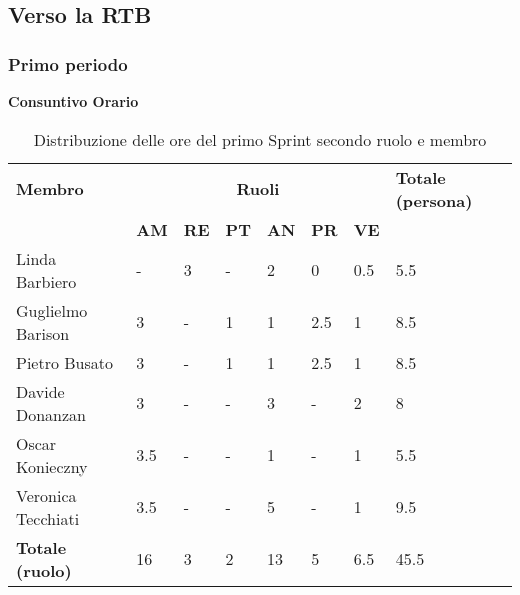 \subsection{Verso la RTB}
\subsubsection{Primo periodo}
\textbf{Consuntivo Orario}
\\
\begin{table}[ht!]
	\centering
	\begin{tabular}{p{4cm} p{1cm} p{1cm} p{1cm} p{1cm} p{1cm} p{1cm} p{3cm}}
		\toprule
        \textbf{Membro} & \multicolumn{6}{c}{\textbf{Ruoli}} & \textbf{Totale (persona)}\\
		& \textbf{AM} & \textbf{RE} & \textbf{PT} & \textbf{AN} & \textbf{PR} & \textbf{VE}\\
		\midrule
        Linda Barbiero          & -     & 3     & -     & 2     & 0     & 0.5   & 5.5 \\
        Guglielmo Barison       & 3     & -     & 1     & 1     & 2.5   & 1     & 8.5\\
        Pietro Busato           & 3     & -     & 1     & 1     & 2.5   & 1     & 8.5 \\
        Davide Donanzan         & 3     & -     & -     & 3     & -     & 2     & 8 \\
        Oscar Konieczny         & 3.5   & -     & -     & 1     & -     & 1     & 5.5 \\
        Veronica Tecchiati      & 3.5   & -     & -     & 5     & -     & 1     & 9.5 \\
        \bottomrule
        \textbf{Totale (ruolo)} & 16    & 3     & 2     & 13   & 5     & 6.5   & 45.5 \\
	\end{tabular}
	\caption{Distribuzione delle ore del primo Sprint secondo ruolo e membro}
	\label{table:Distribuzione delle ore consuntive del primo Sprint secondo ruolo e membro}
\end{table}
\newpage

